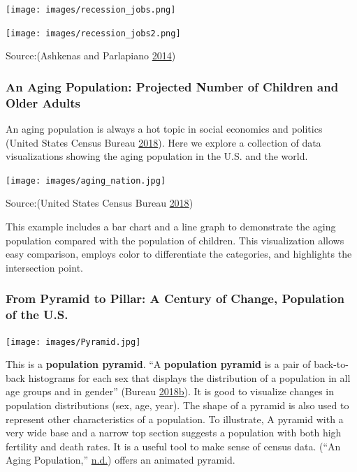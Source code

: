 \documentclass[]{book}
\begin{document}
\texttt{[image: images/recession\_jobs.png]}

\texttt{[image: images/recession\_jobs2.png]}

Source:(Ashkenas and Parlapiano \protect\hyperlink{ref-recession_economy}{2014})

\hypertarget{an-aging-population-projected-number-of-children-and-older-adults}{%
\subsubsection{An Aging Population: Projected Number of Children and Older Adults}\label{an-aging-population-projected-number-of-children-and-older-adults}}

An aging population is always a hot topic in social economics and politics (United States Census Bureau \protect\hyperlink{ref-aging_nation}{2018}). Here we explore a collection of data visualizations showing the aging population in the U.S. and the world.

\texttt{[image: images/aging\_nation.jpg]}

Source:(United States Census Bureau \protect\hyperlink{ref-aging_nation}{2018})

This example includes a bar chart and a line graph to demonstrate the aging population compared with the population of children. This visualization allows easy comparison, employs color to differentiate the categories, and highlights the intersection point.

\hypertarget{from-pyramid-to-pillar-a-century-of-change-population-of-the-u.s.}{%
\subsubsection{From Pyramid to Pillar: A Century of Change, Population of the U.S.}\label{from-pyramid-to-pillar-a-century-of-change-population-of-the-u.s.}}

\texttt{[image: images/Pyramid.jpg]}

This is a \textbf{population pyramid}. ``A \textbf{population pyramid} is a pair of back-to-back histograms for each sex that displays the distribution of a population in all age groups and in gender'' (Bureau \protect\hyperlink{ref-population_pyramid}{2018}\protect\hyperlink{ref-population_pyramid}{b}). It is good to visualize changes in population distributions (sex, age, year). The shape of a pyramid is also used to represent other characteristics of a population. To illustrate, A pyramid with a very wide base and a narrow top section suggests a population with both high fertility and death rates. It is a useful tool to make sense of census data. (``An Aging Population,'' \protect\hyperlink{ref-animated_pyramid}{n.d.}) offers an animated pyramid.
\end{document}
